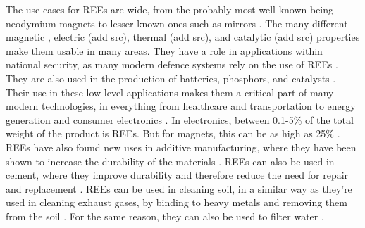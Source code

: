 The use cases for REEs are wide, from the probably most well-known being neodymium magnets \cite{USDoE2024} to lesser-known ones such as mirrors \cite{britannica2024}. The many different magnetic \cite{USDoE2024}, electric (add src), thermal (add src), and catalytic (add src) properties make them usable in many areas. They have a role in applications within national security, as many modern defence systems rely on the use of REEs \cite{USDoE2024}. They are also used in the production of batteries, phosphors, and catalysts \cite{USDoE2024}. Their use in these low-level applications makes them a critical part of many modern technologies, in everything from healthcare and transportation to energy generation and consumer electronics \cite{USDoE2024}. In electronics, between 0.1-5\% of the total weight of the product is REEs. But for magnets, this can be as high as 25\% \cite{britannica2024}. REEs have also found new uses in additive manufacturing, where they have been shown to increase the durability of the materials \cite{additive2022}. REEs can also be used in cement, where they improve durability and therefore reduce the need for repair and replacement \cite{cement2009}. REEs can be used in cleaning soil, in a similar way as they're used in cleaning exhaust gases, by binding to heavy metals and removing them from the soil \cite{soil2017b}. For the same reason, they can also be used to filter water \cite{water2024}.